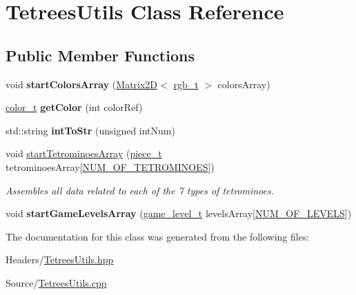 \hypertarget{classTetreesUtils}{}\section{Tetrees\+Utils Class Reference}
\label{classTetreesUtils}
\subsection*{Public Member Functions}
\begin{DoxyCompactItemize}
\item 
\mbox{\label{classTetreesUtils_afaeab256a68024309eefbbdfae158397}} 
void {\bfseries start\+Colors\+Array} (\mbox{\hyperlink{classMatrix2D}{Matrix2D}}$<$ \mbox{\hyperlink{structrgb__t}{rgb\+\_\+t}} $>$ colors\+Array)
\item 
\mbox{\label{classTetreesUtils_a812d9a7bee07fef5dfcec1fd36c4b502}} 
\mbox{\hyperlink{TetreesDefs_8hpp_a8ba5fbce2446135735693ab60c896bbd}{color\+\_\+t}} {\bfseries get\+Color} (int color\+Ref)
\item 
\mbox{\label{classTetreesUtils_ad6ece1c845969a3535b8a6d971d8ddcb}} 
std\+::string {\bfseries int\+To\+Str} (unsigned int\+Num)
\item 
\mbox{\label{classTetreesUtils_acb377319f6772d9e88f677273c895912}} 
void \mbox{\hyperlink{classTetreesUtils_acb377319f6772d9e88f677273c895912}{start\+Tetrominoes\+Array}} (\mbox{\hyperlink{structpiece__t}{piece\+\_\+t}} tetrominoes\+Array\mbox{[}\mbox{\hyperlink{TetreesDefs_8hpp_a69fa4aa1afe74f7f9ec42bf1e07ddf28}{N\+U\+M\+\_\+\+O\+F\+\_\+\+T\+E\+T\+R\+O\+M\+I\+N\+O\+ES}}\mbox{]})
\begin{DoxyCompactList}\small\item\em Assembles all data related to each of the 7 types of tetrominoes. \end{DoxyCompactList}\item 
\mbox{\label{classTetreesUtils_a1bbb7dbec571bf3490fd74fcdacc7640}} 
void {\bfseries start\+Game\+Levels\+Array} (\mbox{\hyperlink{structgame__level__t}{game\+\_\+level\+\_\+t}} levels\+Array\mbox{[}\mbox{\hyperlink{TetreesDefs_8hpp_a350a4204247d3562e237e289533cc31f}{N\+U\+M\+\_\+\+O\+F\+\_\+\+L\+E\+V\+E\+LS}}\mbox{]})
\end{DoxyCompactItemize}


The documentation for this class was generated from the following files\+:\begin{DoxyCompactItemize}
\item 
Headers/\mbox{\hyperlink{TetreesUtils_8hpp}{Tetrees\+Utils.\+hpp}}\item 
Source/\mbox{\hyperlink{TetreesUtils_8cpp}{Tetrees\+Utils.\+cpp}}\end{DoxyCompactItemize}
